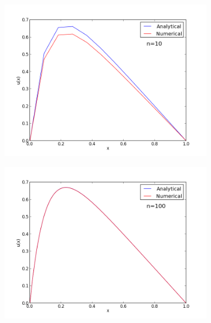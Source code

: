 \documentclass[12pt, a4paper]{article}
\begin{document}
\begin{figure}[ht!]
  \centering
  \begin{subfigure}[b]{0.495\textwidth}
		\includegraphics[width=\textwidth]{../plot_n_10.png}
        \caption{}
  \end{subfigure}
  \begin{subfigure}[b]{0.495\textwidth}
        \includegraphics[width=\textwidth]{../plot_n_100.png}
        \caption{}
  \end{subfigure}
  \begin{subfigure}[b]{0.495\textwidth}

\end{subfigure}
\end{figure}
\end{document}
